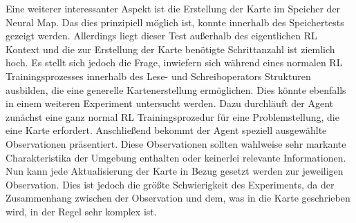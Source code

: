 Eine weiterer interessanter Aspekt ist die Erstellung der Karte im Speicher der Neural Map. Das dies prinzipiell möglich ist, konnte innerhalb des Speichertests gezeigt werden. Allerdings liegt dieser Test außerhalb des eigentlichen RL Kontext und die zur Erstellung der Karte benötigte Schrittanzahl ist ziemlich hoch. Es stellt sich jedoch die Frage, inwiefern sich während eines normalen RL Trainingsprozesses innerhalb des Lese- und Schreiboperators Strukturen ausbilden, die eine generelle Kartenerstellung ermöglichen. Dies könnte ebenfalls in einem weiteren Experiment untersucht werden. Dazu durchläuft der Agent zunächst eine ganz normal RL Trainingsprozedur für eine Problemstellung, die eine Karte erfordert. Anschließend bekommt der Agent speziell ausgewählte Observationen präsentiert. Diese Observationen sollten wahlweise sehr markante Charakteristika der Umgebung enthalten oder keinerlei relevante Informationen. Nun kann jede Aktualisierung der Karte in Bezug gesetzt werden zur jeweiligen Observation. Dies ist jedoch die größte Schwierigkeit des Experiments, da der Zusammenhang zwischen der Observation und dem, was in die Karte geschrieben wird, in der Regel sehr komplex ist.
